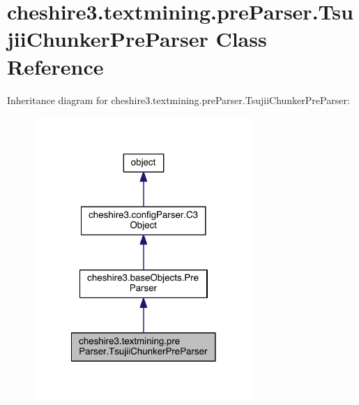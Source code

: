 \hypertarget{classcheshire3_1_1textmining_1_1pre_parser_1_1_tsujii_chunker_pre_parser}{\section{cheshire3.\-textmining.\-pre\-Parser.\-Tsujii\-Chunker\-Pre\-Parser Class Reference}
\label{classcheshire3_1_1textmining_1_1pre_parser_1_1_tsujii_chunker_pre_parser}
}


Inheritance diagram for cheshire3.\-textmining.\-pre\-Parser.\-Tsujii\-Chunker\-Pre\-Parser\-:
\nopagebreak
\begin{figure}[H]
\begin{center}
\leavevmode
\includegraphics[width=234pt]{classcheshire3_1_1textmining_1_1pre_parser_1_1_tsujii_chunker_pre_parser__inherit__graph}
\end{center}
\end{figure}


